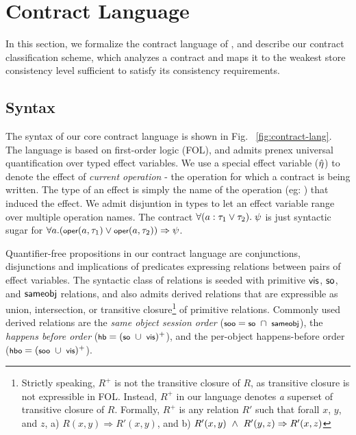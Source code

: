 \section{Contract Language}
\label{sec:contract-lang}



In this section, we formalize the contract language of \name, and describe our
contract classification scheme, which analyzes a contract and maps it to the
weakest store consistency level sufficient to satisfy its consistency
requirements.


\subsection{Syntax}

The syntax of our core contract language is shown in Fig.
~\ref{fig:contract-lang}. The language is based on first-order logic (FOL), and
admits prenex universal quantification over typed effect variables. We use a
special effect variable ($\hat{\eta}$) to denote the effect of \emph{current
operation} - the operation for which a contract is being written. The type of
an effect is simply the name of the operation (eg: ) that induced
the effect. We admit disjuntion in types to let an effect variable range over
multiple operation names. The contract $\small \forall (a : \tau_1 \vee
\tau_2).~\psi$ is just syntactic sugar for $\small \forall a. (\oper{a}{\tau_1}
\vee \oper{a}{\tau_2}) \Rightarrow \psi$.

Quantifier-free propositions in our contract language are conjunctions,
disjunctions and implications of predicates expressing relations between pairs
of effect variables. The syntactic class of relations is seeded with primitive
${\normalfont \textsf{vis}}$, ${\normalfont \textsf{so}}$, and ${\normalfont \textsf{sameobj}}$ relations, and also admits derived relations
that are expressible as union, intersection, or transitive
closure\footnote{Strictly speaking, $R^{+}$ is not the transitive closure of
$R$, as transitive closure is not expressible in FOL. Instead, $R^{+}$ in our
language denotes \emph{a} superset of transitive closure of $R$. Formally,
$R^{+}$ is any relation $R'$ such that forall $x$, $y$, and $z$, a) $R(x,y)
\Rightarrow R'(x,y)$, and b) $R'(x,y) ~\wedge~ R'(y,z) \Rightarrow R'(x,z)$} of
primitive relations. Commonly used derived relations are the \emph{same object
session order} ($\small \sooZ = \soZ ~\cap~ \sameobjZ$), the \emph{happens
before order} ($\small \hbZ = (\soZ ~\cup~ \visZ)^+$), and the per-object
happens-before order ($\small \hboZ = (\sooZ ~\cup~ \visZ)^+$).



